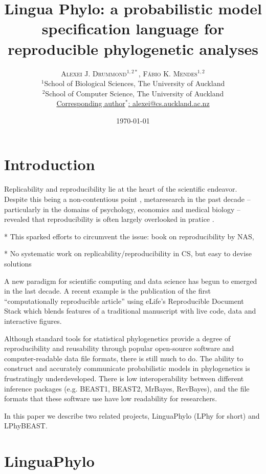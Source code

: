 \documentclass[oneside]{article}
\title{Lingua Phylo: a probabilistic model specification language for
  reproducible phylogenetic analyses}
\author{\textsc{Alexei J. Drummond$^{1,2*}$}, \textsc{F\'{a}bio K. Mendes$^{1,2}$}\\%
\small $^1$School of Biological Sciences, The University of Auckland\\
\small $^2$School of Computer Science, The University of Auckland\\
\small
\href{mailto:alexei@cs.auckland.ac.nz}{Corresponding author$^*$: alexei@cs.auckland.ac.nz}
}
\date{\today} %
\begin{document}
\maketitle


\section{Introduction}

Replicability and reproducibility lie at the heart of the scientific
endeavor.
Despite this being a non-contentious point \citep{baker16},
metaresearch in the past decade -- particularly in the domains of
psychology, economics and medical biology -- revealed that
reproducibility is often largely overlooked in pratice
{\color{red}{[citations]}}.

* This sparked efforts to circumvent the issue: book on
reproducibility by NAS, \citep{sandve13}

* No systematic work on replicability/reproducibility in CS, but easy
to devise solutions

A new paradigm for scientific computing and data science has begun to
emerged in the last decade.
A recent example is the publication of the
first ``computationally reproducible article'' using eLife's
Reproducible Document Stack which blends features of a traditional
manuscript with live code, data and interactive figures. 

Although standard tools for statistical phylogenetics provide a degree
of reproducibility and reusability through popular open-source
software and computer-readable data file formats, there is still much
to do.
The ability to construct and accurately communicate
probabilistic models in phylogenetics is frustratingly
underdeveloped.
There is low interoperability between different
inference packages (e.g. BEAST1, BEAST2, MrBayes, RevBayes), and the
file formats that these software use have low readability for
researchers. 

In this paper we describe two related projects, LinguaPhylo (LPhy for
short) and LPhyBEAST.  

\section{LinguaPhylo}
\end{document}
